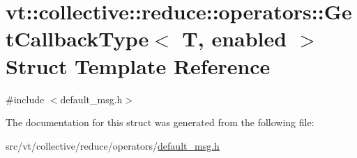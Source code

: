 \hypertarget{structvt_1_1collective_1_1reduce_1_1operators_1_1_get_callback_type}{}\section{vt\+:\+:collective\+:\+:reduce\+:\+:operators\+:\+:Get\+Callback\+Type$<$ T, enabled $>$ Struct Template Reference}
\label{structvt_1_1collective_1_1reduce_1_1operators_1_1_get_callback_type}


{\ttfamily \#include $<$default\+\_\+msg.\+h$>$}



The documentation for this struct was generated from the following file\+:\begin{DoxyCompactItemize}
\item 
src/vt/collective/reduce/operators/\hyperlink{default__msg_8h}{default\+\_\+msg.\+h}\end{DoxyCompactItemize}

